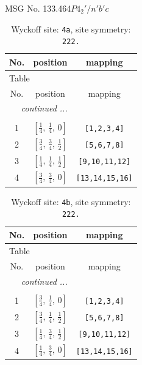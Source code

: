 \documentclass[fleqn,8pt]{jsarticle}
\begin{document}
\setcounter{MaxMatrixCols}{32}

\renewcommand{\tablename}{Table~}
\renewcommand{\figurename}{Figure~}
\begin{center}
\LARGE
MSG No. 133.464\quad$P4_{2}'/n'b'c$
\end{center}
\renewcommand{\arraystretch}{1.2}
\begin{longtable}{ccc}
\caption{Wyckoff site: {\tt 4a}, site symmetry: {\tt 222.}}
 \\
 \hline \hline
No. & position & mapping \\ \hline \endfirsthead

\multicolumn{2}{l}{\tablename\ \thetable{}} \\
 \hline \hline
No. & position & mapping \\ \hline \endhead

 \hline \hline
\multicolumn{2}{r}{\footnotesize\it continued ...} \\ \endfoot

 \hline \hline
\multicolumn{2}{r}{} \\ \endlastfoot

1 & $\left[ \frac{1}{4},\, \frac{1}{4},\, 0 \right]$ & {\tt [1,2,3,4]} \\ \hline
2 & $\left[ \frac{3}{4},\, \frac{3}{4},\, \frac{1}{2} \right]$ & {\tt [5,6,7,8]} \\ \hline
3 & $\left[ \frac{1}{4},\, \frac{1}{4},\, \frac{1}{2} \right]$ & {\tt [9,10,11,12]} \\ \hline
4 & $\left[ \frac{3}{4},\, \frac{3}{4},\, 0 \right]$ & {\tt [13,14,15,16]} \\
\end{longtable}
\renewcommand{\arraystretch}{1.2}
\begin{longtable}{ccc}
\caption{Wyckoff site: {\tt 4b}, site symmetry: {\tt 222.}}
 \\
 \hline \hline
No. & position & mapping \\ \hline \endfirsthead

\multicolumn{2}{l}{\tablename\ \thetable{}} \\
 \hline \hline
No. & position & mapping \\ \hline \endhead

 \hline \hline
\multicolumn{2}{r}{\footnotesize\it continued ...} \\ \endfoot

 \hline \hline
\multicolumn{2}{r}{} \\ \endlastfoot

1 & $\left[ \frac{3}{4},\, \frac{1}{4},\, 0 \right]$ & {\tt [1,2,3,4]} \\ \hline
2 & $\left[ \frac{3}{4},\, \frac{1}{4},\, \frac{1}{2} \right]$ & {\tt [5,6,7,8]} \\ \hline
3 & $\left[ \frac{1}{4},\, \frac{3}{4},\, \frac{1}{2} \right]$ & {\tt [9,10,11,12]} \\ \hline
4 & $\left[ \frac{1}{4},\, \frac{3}{4},\, 0 \right]$ & {\tt [13,14,15,16]} \\
\end{longtable}
\end{document}
